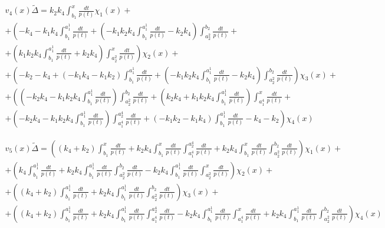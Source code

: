 \documentclass[a4paper,12pt]{article} %
\begin{document}
\begin{multline}
	{v_4(x)}{\tilde{\Delta}}=
	k_2 k_4 \int_{b_1}^{x}\frac{dt}{p(t)} \chi_1(x)
	+\\+
	\left( -k_4-k_1 k_4 \int_{b_1}^{a_1^1}\frac{dt}{p(t)}+\left( -k_1 k_2 k_4 \int_{b_1}^{a_1^1}\frac{dt}{p(t)}-k_2 k_4\right)  \int_{a_2^2}^{b_2}\frac{dt}{p(t)}
	\right. +\\+ \left.
	\left( k_1 k_2 k_4 \int_{b_1}^{a_1^1}\frac{dt}{p(t)}+k_2 k_4\right)  \int_{a_2^2}^{x}\frac{dt}{p(t)}\right)  \chi_2(x)
	+\\+
	\left( -k_2-k_4+\left( -k_1 k_4-k_1 k_2\right)  \int_{b_1}^{a_1^1}\frac{dt}{p(t)}+\left( -k_1 k_2 k_4 \int_{b_1}^{a_1^1}\frac{dt}{p(t)}-k_2 k_4\right)  \int_{a_2^2}^{b_2}\frac{dt}{p(t)}\right)  \chi_3(x)
	+\\+
	\left(\left( -k_2 k_4-k_1 k_2 k_4 \int_{b_1}^{a_1^1}\frac{dt}{p(t)}\right)  \int_{a_2^2}^{b_2}\frac{dt}{p(t)}+\left( k_2 k_4+k_1 k_2 k_4 \int_{b_1}^{a_1^1}\frac{dt}{p(t)}\right)  \int_{a_1^4}^{x}\frac{dt}{p(t)}
	\right. +\\+ \left.
	\left( -k_2 k_4-k_1 k_2 k_4 \int_{b_1}^{a_1^1}\frac{dt}{p(t)}\right)  \int_{a_1^4}^{a_2^4}\frac{dt}{p(t)}+\left( -k_1 k_2-k_1 k_4\right)  \int_{b_1}^{a_1^1}\frac{dt}{p(t)}-k_4-k_2\right)
	\chi_4(x)
\end{multline}

\begin{multline}
	{v_5(x)}{\tilde{\Delta}}=
	\left( \left( k_4+k_2\right)  \int_{b_1}^{x}\frac{dt}{p(t)}+k_2 k_4 \int_{b_1}^{x}\frac{dt}{p(t)} \int_{a_1^4}^{a_2^4}\frac{dt}{p(t)}+k_2 k_4 \int_{b_1}^{x}\frac{dt}{p(t)} \int_{a_2^2}^{b_2}\frac{dt}{p(t)}\right)  \chi_1(x)
	+\\+
	\left( k_4 \int_{b_1}^{a_1^1}\frac{dt}{p(t)}+k_2 k_4 \int_{b_1}^{a_1^1}\frac{dt}{p(t)} \int_{a_2^2}^{b_2}\frac{dt}{p(t)}-k_2 k_4 \int_{b_1}^{a_1^1}\frac{dt}{p(t)} \int_{a_2^2}^{x}\frac{dt}{p(t)}\right)  \chi_2(x)
	+\\+
	\left( \left( k_4+k_2\right)  \int_{b_1}^{a_1^1}\frac{dt}{p(t)}+k_2 k_4 \int_{b_1}^{a_1^1}\frac{dt}{p(t)} \int_{a_2^2}^{b_2}\frac{dt}{p(t)}\right)  \chi_3(x)
	+\\+
	\left( \left( k_4+k_2\right)  \int_{b_1}^{a_1^1}\frac{dt}{p(t)}+k_2 k_4 \int_{b_1}^{a_1^1}\frac{dt}{p(t)} \int_{a_1^4}^{a_2^4}\frac{dt}{p(t)}-k_2 k_4 \int_{b_1}^{a_1^1}\frac{dt}{p(t)} \int_{a_1^4}^{x}\frac{dt}{p(t)}+k_2 k_4 \int_{b_1}^{a_1^1}\frac{dt}{p(t)} \int_{a_2^2}^{b_2}\frac{dt}{p(t)}\right)  \chi_4(x)
\end{multline}
\end{document}
